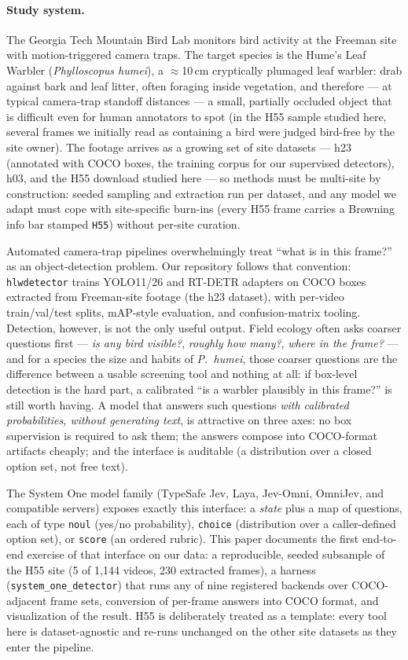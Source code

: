 \documentclass[11pt]{article}
\newcommand{\code}[1]{\texttt{#1}}
\newcommand{\pkg}[1]{\texttt{#1}}
\newcommand{\sone}{System One}
\begin{document}
\paragraph{Study system.} The Georgia Tech Mountain Bird Lab monitors bird
activity at the Freeman site with motion-triggered camera traps. The target
species is the Hume's Leaf Warbler (\emph{Phylloscopus humei}), a
$\approx$10\,cm cryptically plumaged leaf warbler: drab against bark and leaf
litter, often foraging inside vegetation, and therefore --- at typical
camera-trap standoff distances --- a small, partially occluded object that is
difficult even for human annotators to spot (in the H55 sample studied here,
several frames we initially read as containing a bird were judged bird-free by
the site owner). The footage arrives as a growing set of
site datasets --- h23 (annotated with COCO boxes, the training corpus for our
supervised detectors), h03, and the H55 download studied here --- so methods
must be multi-site by construction: seeded sampling and extraction run
per dataset, and any model we adapt must cope with site-specific burn-ins
(every H55 frame carries a Browning info bar stamped \code{H55}) without
per-site curation.

Automated camera-trap pipelines overwhelmingly treat ``what is in this
frame?'' as an object-detection problem. Our repository follows that
convention: \pkg{hlwdetector} trains YOLO11/26 and RT-DETR adapters on COCO
boxes extracted from Freeman-site footage (the h23 dataset), with per-video
train/val/test splits, mAP-style evaluation, and confusion-matrix tooling.
Detection, however, is not the only useful output. Field ecology often asks
coarser questions first --- \emph{is any bird visible?}, \emph{roughly how
many?}, \emph{where in the frame?} --- and for a species the size and habits
of \emph{P.~humei}, those coarser questions are the difference between a
usable screening tool and nothing at all: if box-level detection is the hard
part, a calibrated ``is a warbler plausibly in this frame?'' is still worth
having. A model that answers such questions \emph{with calibrated
probabilities, without generating text}, is attractive on three axes: no box
supervision is required to ask them; the answers compose into COCO-format
artifacts cheaply; and the interface is auditable (a distribution over a
closed option set, not free text).

The \sone{} model family (TypeSafe Jev, Laya, Jev-Omni, OmniJev, and
compatible servers) exposes exactly this interface: a \emph{state} plus a map
of questions, each of type \code{noul} (yes/no probability), \code{choice}
(distribution over a caller-defined option set), or \code{score} (an ordered
rubric). This paper documents the first end-to-end exercise of that interface
on our data: a reproducible, seeded subsample of the H55 site (5 of 1{,}144
videos, 230 extracted frames), a harness (\pkg{system\_one\_detector}) that
runs any of nine registered backends over COCO-adjacent frame sets, conversion
of per-frame answers into COCO format, and visualization of the result. H55 is
deliberately treated as a template: every tool here is dataset-agnostic and
re-runs unchanged on the other site datasets as they enter the pipeline.
\end{document}
